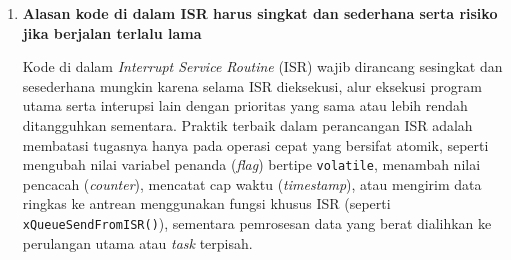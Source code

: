 \begin{enumerate}[label=\textbf{\arabic*.}, leftmargin=*, itemsep=10pt]
    \begin{itemize}
        \item \textbf{Metode \textit{Polling}:} Program utama secara berkala membaca status logika pin tombol (misalnya melalui pemanggilan fungsi \texttt{digitalRead()}) di dalam perulangan terus-menerus. Apabila tombol ditekan dan dilepas secara cepat ketika CPU sedang mengeksekusi instruksi lain atau fungsi tunda, perubahan sinyal tersebut dapat terlewatkan. Selain itu, waktu prosesor terbuang untuk memeriksa tombol meskipun tidak terjadi perubahan status.
        \item \textbf{Metode \textit{Interrupt}:} Rangkaian perangkat keras pengendali GPIO pada mikrokontroler dikonfigurasi untuk mendeteksi transisi tepi sinyal tertentu (\textit{rising edge}, \textit{falling edge}, atau \textit{change}). Saat tombol ditekan dan memicu transisi logika, perangkat keras segera membangkitkan permintaan interupsi (\textit{Interrupt Request}). CPU menghentikan sementara eksekusi program utama, menyimpan konteks register saat ini, mengeksekusi fungsi penanganan khusus yang disebut \textit{Interrupt Service Routine} (ISR), lalu kembali melanjutkan instruksi yang tertunda.
    \end{itemize}

    \item \textbf{Alasan kode di dalam ISR harus singkat dan sederhana serta risiko jika berjalan terlalu lama}

    Kode di dalam \textit{Interrupt Service Routine} (ISR) wajib dirancang sesingkat dan sesederhana mungkin karena selama ISR dieksekusi, alur eksekusi program utama serta interupsi lain dengan prioritas yang sama atau lebih rendah ditangguhkan sementara. Praktik terbaik dalam perancangan ISR adalah membatasi tugasnya hanya pada operasi cepat yang bersifat atomik, seperti mengubah nilai variabel penanda (\textit{flag}) bertipe \texttt{volatile}, menambah nilai pencacah (\textit{counter}), mencatat cap waktu (\textit{timestamp}), atau mengirim data ringkas ke antrean menggunakan fungsi khusus ISR (seperti \texttt{xQueueSendFromISR()}), sementara pemrosesan data yang berat dialihkan ke perulangan utama atau \textit{task} terpisah.


\end{enumerate}
